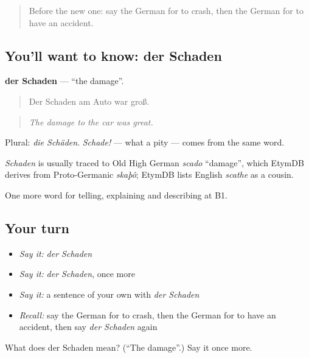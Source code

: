 \label{lesson:GE-C288-schaden}



\begin{quote}
Before the new one: say the German for to crash, then the German for to have an accident.
\end{quote}

\subsection*{You'll want to know: der Schaden}
\textbf{der Schaden} — \textquotedblleft{}the damage\textquotedblright{}.

\begin{quote}
Der Schaden am Auto war groß.
\end{quote}

\begin{quote}
\emph{The damage to the car was great.}
\end{quote}

Plural: \emph{die Schäden}. \emph{Schade!} — what a pity — comes from the same word.

\begin{cousinweb}
\emph{Schaden} is usually traced to Old High German \emph{scado} \textquotedblleft{}damage\textquotedblright{}, which EtymDB derives from Proto-Germanic \emph{skaþô}; EtymDB lists English \emph{scathe} as a cousin.
\end{cousinweb}

\begin{grammarlens}[title={What you've built}]
One more word for telling, explaining and describing at B1.
\end{grammarlens}

\subsection*{Your turn}
\begin{itemize}
\raggedright
  \item \emph{Say it:} \emph{der Schaden}
  \item \emph{Say it:} \emph{der Schaden}, once more
  \item \emph{Say it:} a sentence of your own with \emph{der Schaden}
  \item \emph{Recall:} say the German for to crash, then the German for to have an accident, then say \emph{der Schaden} again
\end{itemize}

\begin{tcolorbox}[breakable,colback=teal!4,colframe=teal!35!black,title={Before you move on}]
What does der Schaden mean? (\textquotedblleft{}The damage\textquotedblright{}.) Say it once more.
\end{tcolorbox}
